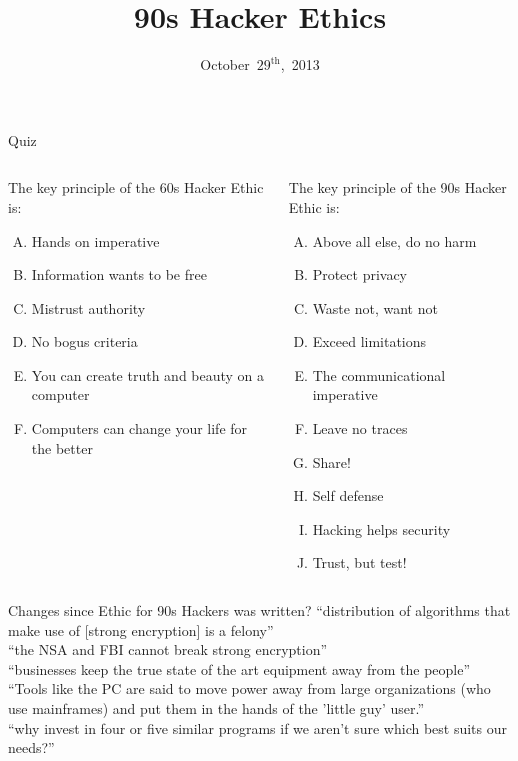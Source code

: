\documentclass{beamer}
\title{90s Hacker Ethics}
\date{October~$29^{\text{th}}$,~2013}
\begin{document}
\begin{frame}
\titlepage
\end{frame}

\begin{frame}{Quiz}
\begin{columns}[T]
\begin{column}{0.485\textwidth}
The key principle of the 60s Hacker Ethic is:
\begin{enumerate}[(A)]
\item<1> Hands on imperative
\item<1-2> Information wants to be free %
\item<1> Mistrust authority
\item<1> No bogus criteria
\item<1> You can create truth and beauty on a computer
\item<1> Computers can change your life for the better
\end{enumerate}
\end{column}
\begin{column}{0.485\textwidth}
The key principle of the 90s Hacker Ethic is:
\begin{enumerate}[(A)]
\item<1> Above all else, do no harm
\item<1> Protect privacy
\item<1> Waste not, want not
\item<1> Exceed limitations
\item<1-2> The communicational imperative %
\item<1> Leave no traces
\item<1> Share!
\item<1> Self defense
\item<1> Hacking helps security
\item<1> Trust, but test!
\end{enumerate}
\end{column}
\end{columns}
\end{frame}

\begin{frame}{Changes since Ethic for 90s Hackers was written?}
``distribution of algorithms that make use of [strong encryption] is a felony''\\[1em]
\pause
``the NSA and FBI cannot break strong encryption''\\[1em]
\pause
``businesses keep the true state of the art equipment away from the people''\\[1em]
\pause
``Tools like the PC are said to move power away from large organizations (who use mainframes) and put them in the hands of the 'little guy' user.''\\[1em]
\pause
``why invest in four or five similar programs if we aren't sure which best suits our needs?''
\end{frame}
\end{document}
